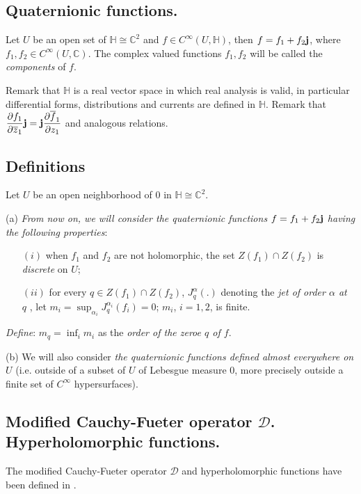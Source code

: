 \documentclass[12pt]{amsart}
\theoremstyle{definition}
\begin{document}
\subsection {Quaternionic functions.}

Let $U$ be an open set of ${\mathbb H}\cong{\mathbb{C}}^2$ and $f\in C^\infty (U,{\mathbb H})$, then 
$f=f_1+f_2{\bf j}$, where $f_1, f_2\in C^\infty (U,{\mathbb{C}})$. The complex valued functions $f_1,f_2$ will be called the {\it components} of $f$.\smallskip

Remark that ${\mathbb H}$ is a real vector space in which real analysis is valid, in particular differential forms, distributions and currents are defined in ${\mathbb H}$. 
\smallskip
Remark that $\displaystyle\frac{\partial
f_1}{\partial\overline z_1}{\bf j}={\bf j}\frac{\partial\overline 
f_1}{\partial z_1}$ and analogous relations.

\subsection{Definitions} Let $U$ be an open neighborhood of 0 in ${\mathbb H}\cong{\mathbb{C}}^2$. 

\noindent
(a) {\it From now on, we will consider the quaternionic functions $f=f_1+f_2{\bf j}$ having the following properties}: 
\begin{enumerate}
\item[$(i)$] when $f_1$ and $f_2$ are not holomorphic, the set $Z(f_1)\cap Z(f_2)$ is {\it discrete} on $U$;
\item[$(ii)$] for every $q\in Z(f_1)\cap Z(f_2)$, $J_q^\alpha (.)$ denoting the {\it jet of order $\alpha$ at~$q$} \cite{M 66}, let $\displaystyle m_i=\sup_{\alpha_i} J_q^{\alpha_i}(f_i)=0$; $m_i$, $i=1,2$, is finite.
\end{enumerate}

{\it Define}: $\displaystyle m_q=\inf_i m_i$ as the {\it order of the zeroe $q$ of $f$}. 

\noindent
(b) We will also consider {\it the quaternionic functions defined almost everywhere on $U$} (i.e. outside of a subset of $U$ of Lebesgue measure 0, more precisely outside a finite set of $C^\infty$ hypersurfaces).

\subsection {Modified Cauchy-Fueter operator ${\mathcal D}$. 
Hyperholomorphic functions.} 
The modified Cauchy-Fueter operator ${\mathcal D}$ and hyperholomorphic functions have been defined in \cite{CLSSS 07,F 39}.      
\end{document}

